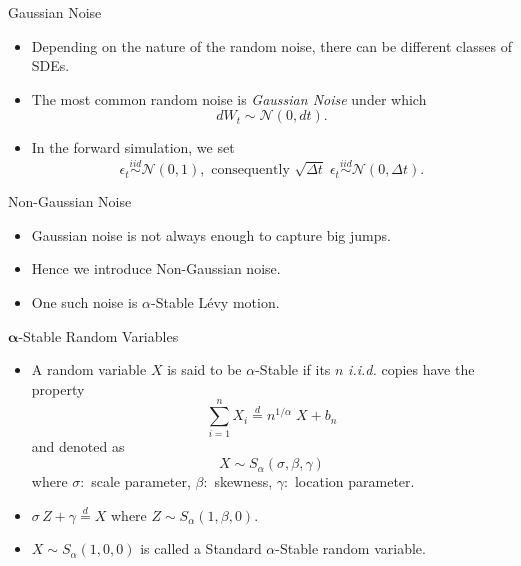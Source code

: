 \begin{frame}{Gaussian Noise}

\begin{itemize}
\item<1-> Depending on the nature of the random noise, there can be different classes of SDEs. 

\item<2-> The most common random noise is \textit{Gaussian Noise} under which $$dW_t \sim \mathcal{N}(0, dt).$$

\item<3-> In the forward simulation, we set $$\epsilon_t \overset{iid}{\sim} \mathcal{N}(0, 1), \text{ consequently } \sqrt{\Delta t} \; \epsilon_t \overset{iid}{\sim} \mathcal{N}(0, \Delta t).$$
\end{itemize}

\end{frame}



\begin{frame}{Non-Gaussian Noise}

\begin{itemize}
\item<1-> Gaussian noise is not always enough to capture big jumps. 

\item<2-> Hence we introduce Non-Gaussian noise.

\item<3-> One such noise is $\alpha$-Stable Lévy motion.
\end{itemize}

\end{frame}




\begin{frame}{$\boldsymbol{\alpha}$-Stable Random Variables}

\begin{itemize}

\item<1-> A random variable $X$ is said to be $\alpha$-Stable if its $n$ \textit{i.i.d.} copies have the property $$\sum \limits_{i = 1}^{n} X_i \overset{d}{=} n^{1/\alpha} \; X + b_n$$ and denoted as $$X \sim S_{\alpha} (\sigma, \beta, \gamma)$$ where $\sigma :$ scale parameter, $\beta :$ skewness, $\gamma :$ location parameter.

\item<2-> $\sigma \, Z + \gamma \overset{d}{=} X$ where $Z \sim S_{\alpha}(1, \beta, 0)$.

\item<3-> $X \sim S_{\alpha}(1, 0, 0)$ is called a Standard $\alpha$-Stable random variable.
\end{itemize}

\end{frame}



